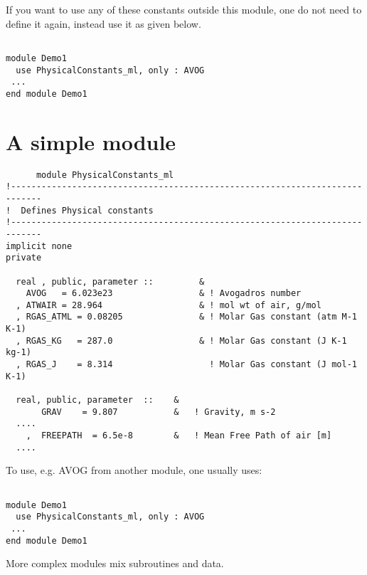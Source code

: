  If you want to use any of these constants
outside this module, one do not need to define it again, instead use
it as given below. 

\begin{verbatim}

module Demo1
  use PhysicalConstants_ml, only : AVOG
 ...
end module Demo1

\end{verbatim}



\section*{A simple module}

\begin{verbatim}
      module PhysicalConstants_ml
!----------------------------------------------------------------------------
!  Defines Physical constants
!----------------------------------------------------------------------------
implicit none
private

  real , public, parameter ::         &
    AVOG   = 6.023e23                 & ! Avogadros number
  , ATWAIR = 28.964                   & ! mol wt of air, g/mol
  , RGAS_ATML = 0.08205               & ! Molar Gas constant (atm M-1 K-1)
  , RGAS_KG   = 287.0                 & ! Molar Gas constant (J K-1 kg-1)
  , RGAS_J    = 8.314                   ! Molar Gas constant (J mol-1 K-1)

  real, public, parameter  ::    &
       GRAV    = 9.807           &   ! Gravity, m s-2
  ....
    ,  FREEPATH  = 6.5e-8        &   ! Mean Free Path of air [m]
  ....

\end{verbatim}



To use, e.g.  AVOG from another module, one usually uses:

\begin{verbatim}

module Demo1
  use PhysicalConstants_ml, only : AVOG
 ...
end module Demo1

\end{verbatim}

More complex modules mix subroutines and data.


